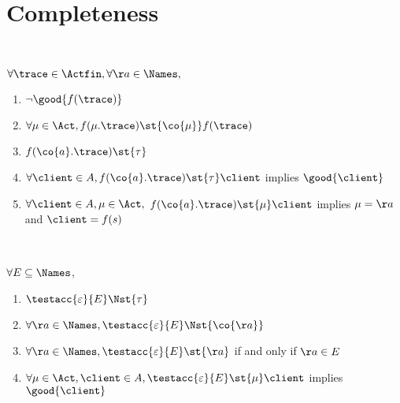 \section{Completeness}

\begin{table*}
  \hrulefill\\

    \begin{minipage}{300pt}%
      $\forall \trace \in \Actfin, \forall \aa \in \Names,$
      \begin{enumerate}[(1)]
      \item
        \label{gen-spec-ungood}
        $ \lnot \good{f(\trace)}$
      \item
        \label{gen-spec-mu-lts-co}
        $ \forall \mu \in \Act, f (\mu.\trace) \st{\co{\mu}} f(\trace)$
      \item
        \label{gen-spec-mu-out-ex-tau}
        $ f (\co{a}.\trace) \st{\tau} $
      \item
        \label{gen-spec-out-good}
        $ \forall \client \in \States, f (\co{a}.\trace)
        \st{\tau} \client$ implies $\good{ \client }$
      \item
        \label{gen-spec-out-mu-inp}
        $ \forall \client \in \States, \mu \in \Act,$
        $f (\co{a}.\trace) \st{\mu} \client$ implies $\mu = \aa$ and
        $\client = f(s)$
      \end{enumerate}
    \end{minipage}
    \\[2em]
    \begin{minipage}{300pt}
      $\forall E \subseteq \Names$,
      \begin{enumerate}[(t1)]
      \item\label{gen-spec-acc-nil-stable-tau}
        $\testacc{\varepsilon}{E} \Nst{\tau}$
      \item\label{gen-spec-acc-nil-stable-out}
        $\forall \aa \in \Names, \testacc{\varepsilon}{E} \Nst{\co{\aa}}$
      \item\label{gen-spec-acc-nil-mem-lts-inp}
        $\forall \aa \in \Names, \testacc{\varepsilon}{E} \st{\aa}$ if and only if
        $\aa \in E$
      \item\label{gen-spec-acc-nil-lts-inp-good}
        $\forall \mu \in \Act, \client \in \States,
        \testacc{\varepsilon}{E} \st{\mu} \client$ implies $\good{\client}$
      \end{enumerate}
    \end{minipage}

\end{table*}
